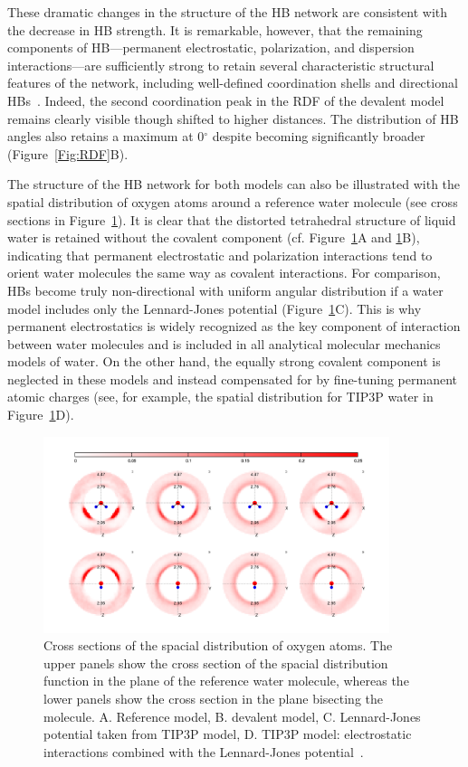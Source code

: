 \documentclass[10pt,amsmath,twocolumn,aps,prl,superscriptaddress,floatfix]{revtex4-1}
\begin{document}
These dramatic changes in the structure of the HB network are consistent with the decrease in HB strength. 
It is remarkable, however, that the remaining components of HB---permanent electrostatic, polarization, and dispersion interactions---are sufficiently strong to retain several characteristic structural features of the network, including well-defined coordination shells and directional HBs~\cite{arunan2011definition}. 
Indeed, the second coordination peak in the RDF of the devalent model remains clearly visible though shifted to higher distances. 
The distribution of HB angles also retains a maximum at 0$^\circ$ despite becoming significantly broader (Figure~\ref{Fig:RDF}B).

The structure of the HB network for both models can also be illustrated with the spatial distribution of oxygen atoms around a reference water molecule (see cross sections in Figure~\ref{Fig:SDF}). 
It is clear that the distorted tetrahedral structure of liquid water is retained without the covalent component (cf. Figure~\ref{Fig:SDF}A and \ref{Fig:SDF}B), indicating that permanent electrostatic and polarization interactions tend to orient water molecules the same way as covalent interactions. 
For comparison, HBs become truly non-directional with uniform angular distribution if a water model includes only the Lennard-Jones potential (Figure~\ref{Fig:SDF}C). %
This is why permanent electrostatics is widely recognized as the key component of interaction between water molecules and is included in all analytical molecular mechanics models of water. 
On the other hand, the equally strong covalent component is neglected in these models and instead compensated for by fine-tuning permanent atomic charges (see, for example, the spatial distribution for TIP3P water in Figure~\ref{Fig:SDF}D). 

\begin{figure}
\includegraphics[width=0.9\textwidth]{SDF}
\caption{Cross sections of the spacial distribution of oxygen atoms. 
The upper panels show the cross section of the spacial distribution function in the plane of the reference water molecule, whereas the lower panels show the cross section in the plane bisecting the molecule. 
A. Reference model, B. devalent model, C. Lennard-Jones potential taken from TIP3P model, D. TIP3P model: electrostatic interactions combined with the Lennard-Jones potential~\cite{TIP3P}.} \label{Fig:SDF}
\end{figure}
 
\end{document}
